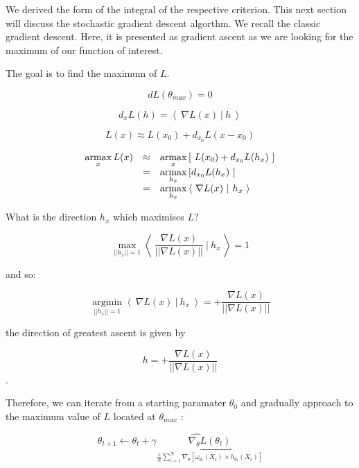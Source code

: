 We derived the form of the integral of the respective criterion. This next section will discuss the stochastic gradient descent algorthm. We recall the classic gradient descent. Here, it is presented as gradient ascent as we are looking for the maximum of our function of interest. 

\bigskip

The goal is to find the maximum of $L$.

$$dL(\theta_{max}) = 0$$

$$d_xL(h) = \left< \ \nabla L(x) \ | \ h \ \right>$$

$$L(x) \approx L(x_0) + d_{x_0}L(x - x_0)$$


$$
\begin{array}{rcl}
\argmax\limits_x L(x) &\approx& \argmax\limits_{x} \left[ \ L(x_0) + d_{x_0}L(h_x) \ \right]
\\
& = &
\argmax\limits_{h_x} \left[ d_{x_0}L(h_x) \ \right]
\\
& = &
\argmax\limits_{h_x} \left< \ \nabla L(x) \ | \ h_x \ \right>
\end{array}
$$


What is the direction $h_x$ which maximises $L$?

$$\underset{||h_x|| = 1}{\operatorname{max}} \left< \ \frac{\nabla L(x)}{|| \nabla L(x) ||} \ | \ h_x \ \right> = 1$$

and so:

$$\underset{||h_x|| = 1}{\operatorname{argmin}} \left< \ {\nabla L(x)} \ | \ h_x \ \right> = {+} \frac{\nabla L(x)}{|| \nabla L(x) ||}$$

the direction of greatest ascent is given by

$$h = + \frac{\nabla L(x)}{|| \nabla L(x) ||}$$.

\bigskip

Therefore, we can iterate from a starting paramater $\theta_0$ and gradually approach to the maximum value of $L$ located at $\theta_{max}$ :

\bigskip

$$\boxed{\theta_{t+1} \leftarrow \theta_t + \gamma \underbracket{ \widehat{\nabla_\theta L}(\theta_t)}_{\frac 1 N \displaystyle\sum_{i = 1}^N \nabla_\theta \left[\omega_{\theta_t}(X_i) \times h_{\theta_t}(X_i)\right]}}$$

